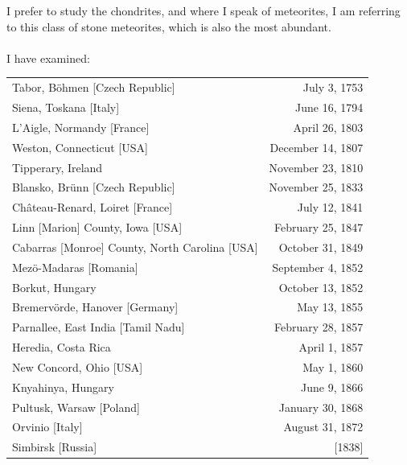 \documentclass[a4paper, 12pt, oneside]{article}
\begin{document}
I prefer to study the chondrites, and where I speak of meteorites, I am referring to this class of stone meteorites, which is also the most abundant.
\paragraph*{}
I have examined:
\begin{center}
\footnotesize
\begin{tabular}{ l r }
 Tabor, Böhmen [Czech Republic] & July 3, 1753\index{meteorite!Tabor} \\
 Siena, Toskana [Italy] & June 16, 1794\index{meteorite!Siena} \\
 L'Aigle, Normandy [France] & April 26, 1803\index{meteorite!L'Aigle} \\
 Weston, Connecticut [USA] & December 14, 1807\index{meteorite!Weston} \\
 Tipperary, Ireland & November 23, 1810\index{meteorite!Tipperary} \\
 Blansko, Brünn [Czech Republic] & November 25, 1833\index{meteorite!Blansko} \\
 Château-Renard, Loiret [France] & July 12, 1841\index{meteorite!Château-Renard} \\
 Linn [Marion] County, Iowa [USA] & February 25, 1847\index{meteorite!Marion County}\index{meteorite!Linn} \\
 Cabarras [Monroe] County, North Carolina [USA] & October 31, 1849\index{meteorite!Monroe County}\index{meteorite!Cabarras} \\
 Mezö-Madaras [Romania] & September 4, 1852\index{meteorite!Mezö-Madaras} \\
 Borkut, Hungary & October 13, 1852\index{meteorite!Borkut} \\
 Bremervörde, Hanover [Germany] & May 13, 1855\index{meteorite!Bremervörde} \\
 Parnallee, East India [Tamil Nadu] & February 28, 1857\index{meteorite!Parnallee} \\
 Heredia, Costa Rica & April 1, 1857\index{meteorite!Heredia} \\
 New Concord, Ohio [USA] & May 1, 1860\index{meteorite!New Concord} \\
 Knyahinya, Hungary & June 9, 1866\index{meteorite!Knyahinya} \\
 Pultusk, Warsaw [Poland] & January 30, 1868\index{meteorite!Pultusk} \\
 Orvinio [Italy] & August 31, 1872\index{meteorite!Orvinio} \\
 Simbirsk [Russia] & [1838]\index{meteorite!Simbirsk} \\
\end{tabular}
\end{center}
\clearpage
\end{document}
